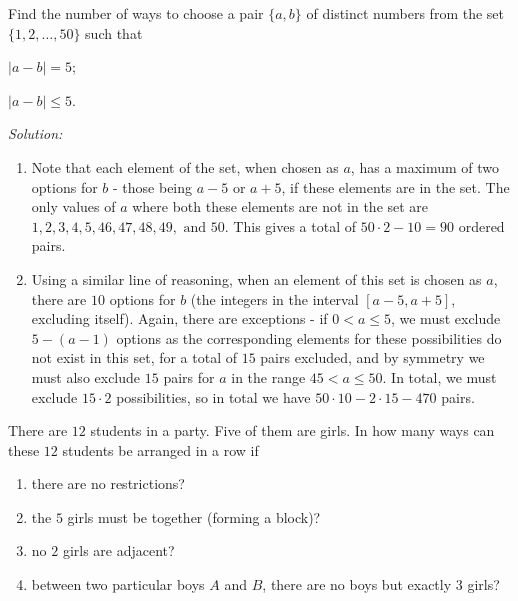 \documentclass[12pt]{scrartcl}
\newenvironment{problem}[2][Problem]{\begin{trivlist}
\item[\hskip \labelsep {\bfseries #1}\hskip \labelsep {\bfseries #2.}]}{\end{trivlist}}
\newenvironment{sol}
    {\emph{Solution:}
    }
    {
    \qedhere
    }
\begin{document}
\thispagestyle{fancy}
\begin{problem}{1} 
Find the number of ways to choose a pair $\{a, b\}$ of distinct numbers from the set $\{1, 2, \ldots, 50\}$ such that\\

\begin{enumerate*}[label=(\roman*),itemjoin={\qquad \qquad}]
	\item $\left| a - b \right| = 5$; 
	\item $\left| a - b \right| \leq 5$. 
\end{enumerate*}
\end{problem}

\begin{sol}
\begin{enumerate}[label=(\roman*)]
\item Note that each element of the set, when chosen as $a$, has a maximum of two options for $b$ - those being $a - 5$ or $a + 5$, if these elements are in the set. The only values of $a$ where both these elements are not in the set are $1, 2, 3, 4, 5, 46, 47, 48, 49, \text{ and } 50$. This gives a total of $50 \cdot 2 - 10 = \boxed{90}$ ordered pairs. 
\item Using a similar line of reasoning, when an element of this set is chosen as $a$, there are $10$ options for $b$ (the integers in the interval $[a-5, a+5]$, excluding itself). Again, there are exceptions - if $0 < a \leq 5$, we must exclude $5-(a-1)$ options as the corresponding elements for these possibilities do not exist in this set, for a total of $15$ pairs excluded, and by symmetry we must also exclude $15$ pairs for $a$ in the range $45 < a \leq 50$. In total, we must exclude $15 \cdot 2$ possibilities, so in total we have $50 \cdot 10 - 2 \cdot 15 - \boxed{470}$ pairs. 
\end{enumerate}

\end{sol}

\begin{problem}{2}
There are $12$ students in a party. Five of them are girls. In how many ways can these $12$ students be arranged in a row if 
\begin{enumerate}[label=(\roman*)]
\item there are no restrictions?
\item the $5$ girls must be together (forming a block)?
\item no $2$ girls are adjacent? 
\item between two particular boys $A$ and $B$, there are no boys but exactly $3$ girls? 
\end{enumerate}
\end{problem}
\end{document}
